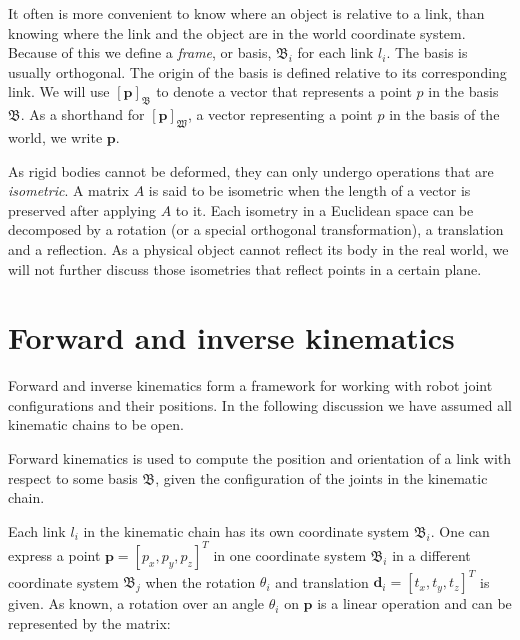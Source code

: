 
It often is more convenient to know where an object is relative to a link,
than knowing where the link and the object are in the world coordinate system.
Because of this we define a \emph{frame}, or basis, $\mathfrak{B}_i$ for
each link $l_i$.  The basis is usually orthogonal.  The origin of the basis is
defined relative to its corresponding link.  We will use
$[\mathbf{p}]_{\mathfrak{B}}$ to denote a vector that represents a point $p$
in the basis $\mathfrak{B}$.  As a shorthand for
$[\mathbf{p}]_\mathfrak{W}$, a vector representing a point $p$ in the basis of
the world, we write $\mathbf{p}$.

As rigid bodies cannot be deformed, they can only undergo operations that are
\emph{isometric}.  A matrix $A$ is said to be isometric when
the length of a vector is preserved after applying $A$ to it.  Each isometry
in a Euclidean space can be decomposed by a rotation (or a special orthogonal
transformation), a translation and a reflection.  As a physical object cannot
reflect its body in the real world, we will not further discuss those
isometries that reflect points in a certain plane.





\section{Forward and inverse kinematics}
\label{sec:kinematics}
Forward and inverse kinematics form a framework for working with robot joint
configurations and their positions.  In the following discussion we have
assumed all kinematic chains to be open.

Forward kinematics is used to compute the position and orientation of a link
with respect to some basis $\mathfrak{B}$, given the configuration of the
joints in the kinematic chain.  

Each link $l_i$ in the kinematic chain has its own coordinate system
$\mathfrak{B}_i$. One can express a point $\mathbf{p} = \left[p_x, p_y,
p_z\right]^T$ in one coordinate system $\mathfrak{B}_i$ in a different
coordinate system $\mathfrak{B}_j$ when the rotation $\theta_i$ and
translation $\mathbf{d}_i = \left[t_x, t_y, t_z\right]^T$ is given.  As known, a
rotation over an angle $\theta_i$ on $\mathbf{p}$ is a linear operation and can
be represented by the matrix:


